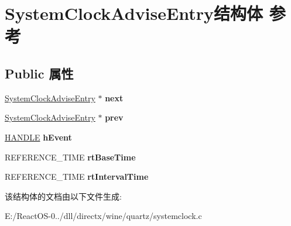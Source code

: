 \hypertarget{struct_system_clock_advise_entry}{}\section{System\+Clock\+Advise\+Entry结构体 参考}
\label{struct_system_clock_advise_entry}
\subsection*{Public 属性}
\begin{DoxyCompactItemize}
\item 
\mbox{\label{struct_system_clock_advise_entry_ad3015095fd7ae91193641a7e663faca0}} 
\hyperlink{struct_system_clock_advise_entry}{System\+Clock\+Advise\+Entry} $\ast$ {\bfseries next}
\item 
\mbox{\label{struct_system_clock_advise_entry_aec04d6f9225a4fc665e81a62a702b5e5}} 
\hyperlink{struct_system_clock_advise_entry}{System\+Clock\+Advise\+Entry} $\ast$ {\bfseries prev}
\item 
\mbox{\label{struct_system_clock_advise_entry_aaba5b0f17ab52341f8e6ee8d2da5120a}} 
\hyperlink{interfacevoid}{H\+A\+N\+D\+LE} {\bfseries h\+Event}
\item 
\mbox{\label{struct_system_clock_advise_entry_a4c5e564cf04d5aeea9eb3098efe97f9b}} 
R\+E\+F\+E\+R\+E\+N\+C\+E\+\_\+\+T\+I\+ME {\bfseries rt\+Base\+Time}
\item 
\mbox{\label{struct_system_clock_advise_entry_aaa2bff18af1160fa63df291c02101a86}} 
R\+E\+F\+E\+R\+E\+N\+C\+E\+\_\+\+T\+I\+ME {\bfseries rt\+Interval\+Time}
\end{DoxyCompactItemize}


该结构体的文档由以下文件生成\+:\begin{DoxyCompactItemize}
\item 
E\+:/\+React\+O\+S-\/0../dll/directx/wine/quartz/systemclock.\+c\end{DoxyCompactItemize}
